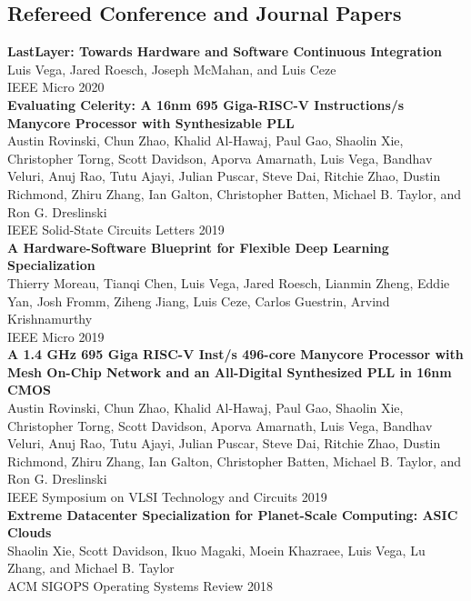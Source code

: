 \documentclass[10pt]{article}
\begin{document}
\subsection*{Refereed Conference and Journal Papers}

\textbf{%
  LastLayer: Towards Hardware and Software Continuous Integration
} \\
Luis Vega, Jared Roesch, Joseph McMahan, and Luis Ceze \\
IEEE Micro 2020 \\

\textbf{%
  Evaluating Celerity: A 16nm 695 Giga-RISC-V Instructions/s Manycore Processor with Synthesizable PLL
} \\
Austin Rovinski, Chun Zhao, Khalid Al-Hawaj, Paul Gao, Shaolin Xie, Christopher Torng,
Scott Davidson, Aporva Amarnath, Luis Vega, Bandhav Veluri, Anuj Rao, Tutu Ajayi,
Julian Puscar, Steve Dai, Ritchie Zhao, Dustin Richmond, Zhiru Zhang, Ian Galton,
Christopher Batten, Michael B. Taylor, and Ron G. Dreslinski \\
IEEE Solid-State Circuits Letters 2019 \\

\textbf{%
  A Hardware-Software Blueprint for Flexible Deep Learning Specialization
} \\
Thierry Moreau, Tianqi Chen, Luis Vega, Jared Roesch, Lianmin Zheng, Eddie Yan,
Josh Fromm, Ziheng Jiang, Luis Ceze, Carlos Guestrin, Arvind Krishnamurthy \\
IEEE Micro 2019 \\
  
\textbf{%
  A 1.4 GHz 695 Giga RISC-V Inst/s 496-core Manycore Processor with Mesh On-Chip Network and an All-Digital Synthesized PLL in 16nm CMOS
} \\
Austin Rovinski, Chun Zhao, Khalid Al-Hawaj, Paul Gao, Shaolin Xie, Christopher Torng,
Scott Davidson, Aporva Amarnath, Luis Vega, Bandhav Veluri, Anuj Rao, Tutu Ajayi,
Julian Puscar, Steve Dai, Ritchie Zhao, Dustin Richmond, Zhiru Zhang, Ian Galton,
Christopher Batten, Michael B. Taylor, and Ron G. Dreslinski \\
IEEE Symposium on VLSI Technology and Circuits 2019 \\
  
\textbf{%
  Extreme Datacenter Specialization for Planet-Scale Computing: ASIC Clouds
} \\
Shaolin Xie, Scott Davidson, Ikuo Magaki, Moein Khazraee, Luis Vega, Lu Zhang, and Michael B. Taylor \\
ACM SIGOPS Operating Systems Review 2018 \\
  
\end{document}

